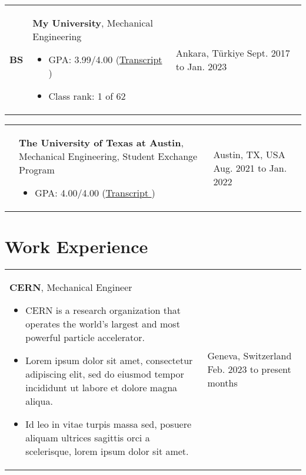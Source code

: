 \documentclass[10pt, a4paper]{article}
\newenvironment{highlights}{
        \begin{itemize}[
                topsep=0pt,
                parsep=0.07 cm,
                partopsep=0pt,
                itemsep=0pt,
                after=\vspace{-1\baselineskip},
                leftmargin=0.6 cm + 3pt
            ]
    }{
        \end{itemize}
    } %
\let\hrefWithoutArrow\href
\renewcommand{\href}[2]{\hrefWithoutArrow{#1}{#2 \raisebox{.15ex}{\footnotesize \faExternalLink*}}}
\begin{document}
        \begin{tabularx}{ cm-0.13cm}{L{0.85cm} K{0.2 cm} R{3.6 cm}}
            \textbf{BS}
            & 
            \textbf{My University}, Mechanical Engineering
            \vspace{0.12 cm}
            \begin{highlights}
                \item GPA: 3.99/4.00 (\href{https://example.com/}{Transcript}) 
                \item Class rank: 1 of 62 \hspace*{-0.2cm}
            \end{highlights}
        &
            Ankara, Türkiye \newline
            Sept. 2017 to Jan. 2023
        \end{tabularx}

        \vspace{0.12 cm}
        \begin{tabularx}{ cm-0.13cm}{L{0.85cm} K{0.2 cm} R{3.6 cm}}
            \textbf{}
            & 
            \textbf{The University of Texas at Austin}, Mechanical Engineering, Student Exchange Program
            \vspace{0.12 cm}
            \begin{highlights}
                \item GPA: 4.00/4.00 (\href{https://example.com/}{Transcript}) \hspace*{-0.2cm}
            \end{highlights}
        &
            Austin, TX, USA \newline
            Aug. 2021 to Jan. 2022
        \end{tabularx}



    \section{Work Experience}
    
        \begin{tabularx}{ cm-0.13cm}{K{0.2 cm} R{3.6 cm}}
            \textbf{CERN}, Mechanical Engineer
            \vspace{0.12 cm}
            \begin{highlights}
                \item CERN is a research organization that operates the world's largest and most powerful particle accelerator. 
                \item Lorem ipsum dolor sit amet, consectetur adipiscing elit, sed do eiusmod tempor incididunt ut labore et dolore magna aliqua. 
                \item Id leo in vitae turpis massa sed, posuere aliquam ultrices sagittis orci a scelerisque, lorem ipsum dolor sit amet. \hspace*{-0.2cm}
            \end{highlights}
        &
            Geneva, Switzerland \newline
            Feb. 2023 to present  months
        \end{tabularx}
\end{document}
